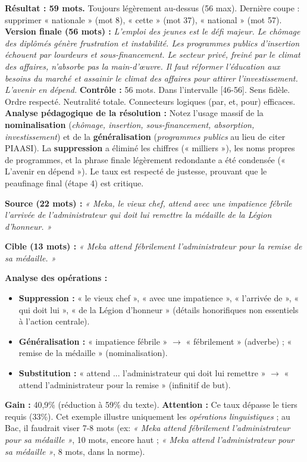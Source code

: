 \documentclass[11pt]{article}
\newcounter{popsec}
\newcounter{popsub}
\newcommand{\courssub}[1]{%
  \stepcounter{popsub}%
  \par\vspace{9pt}\noindent{\popxbold\fontsize{11.5}{13}\selectfont\color{popink}{\color{poporange}\thepopsec.\thepopsub}\hspace{6pt}#1}\par\nopagebreak\vspace{4pt}
}
\begin{document}
\begin{exoresolu}
\textbf{Résultat : 59 mots.} Toujours légèrement au-dessus (56 max). Dernière coupe : supprimer « nationale » (mot 8), « cette » (mot 37), « national » (mot 57).
\textbf{Version finale (56 mots) :}
\emph{L'emploi des jeunes est le défi majeur. Le chômage des diplômés génère frustration et instabilité. Les programmes publics d'insertion échouent par lourdeurs et sous-financement. Le secteur privé, freiné par le climat des affaires, n'absorbe pas la main-d'œuvre. Il faut réformer l'éducation aux besoins du marché et assainir le climat des affaires pour attirer l'investissement. L'avenir en dépend.}
\textbf{Contrôle :} 56 mots. Dans l'intervalle [46-56]. Sens fidèle. Ordre respecté. Neutralité totale. Connecteurs logiques (par, et, pour) efficaces.
\tcblower
\textbf{Analyse pédagogique de la résolution :} 
Notez l'usage massif de la \textbf{nominalisation} (\emph{chômage, insertion, sous-financement, absorption, investissement}) et de la \textbf{généralisation} (\emph{programmes publics} au lieu de citer PIAASI). La \textbf{suppression} a éliminé les chiffres (« milliers »), les noms propres de programmes, et la phrase finale légèrement redondante a été condensée (« L'avenir en dépend »). Le taux est respecté de justesse, prouvant que le peaufinage final (étape 4) est critique.
\end{exoresolu}

\courssub{Exemple chiffré de référence (Modèle minimal)}

\begin{exemplebox}
\textbf{Source (22 mots) :} 
\emph{« Meka, le vieux chef, attend avec une impatience fébrile l'arrivée de l'administrateur qui doit lui remettre la médaille de la Légion d'honneur. »}

\textbf{Cible (13 mots) :} 
\emph{« Meka attend fébrilement l'administrateur pour la remise de sa médaille. »}

\textbf{Analyse des opérations :}
\begin{itemize}
    \item \textbf{Suppression :} « le vieux chef », « avec une impatience », « l'arrivée de », « qui doit lui », « de la Légion d'honneur » (détails honorifiques non essentiels à l'action centrale).
    \item \textbf{Généralisation :} « impatience fébrile » $\rightarrow$ « fébrilement » (adverbe) ; « remise de la médaille » (nominalisation).
    \item \textbf{Substitution :} « attend ... l'administrateur qui doit lui remettre » $\rightarrow$ « attend l'administrateur pour la remise » (infinitif de but).
\end{itemize}
\textbf{Gain :} 40,9\% (réduction à 59\% du texte). \textbf{Attention :} Ce taux dépasse le tiers requis (33\%). Cet exemple illustre uniquement les \emph{opérations linguistiques} ; au Bac, il faudrait viser 7-8 mots (ex: \emph{« Meka attend fébrilement l'administrateur pour sa médaille »}, 10 mots, encore haut ; \emph{« Meka attend l'administrateur pour sa médaille »}, 8 mots, dans la norme).
\end{exemplebox}
\end{document}
